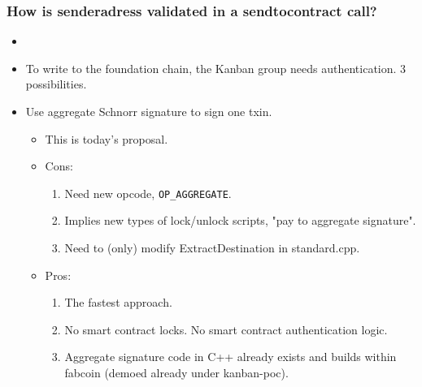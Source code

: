 \begin{frame}[fragile]
\frametitle{How is senderadress validated in a sendtocontract call?}
\begin{itemize}
\item 
\end{itemize}
\end{frame}

\begin{frame}[fragile]
\begin{itemize}
\item To write to the foundation chain, the Kanban group needs authentication. 3 possibilities.
\item Use aggregate Schnorr signature to sign one txin. 
\begin{itemize}
\item This is today's proposal.
\item Cons: 
\begin{enumerate}
\item Need new opcode, \verb|OP_AGGREGATE|. 
\item Implies new types of lock/unlock scripts, "pay to aggregate signature".
\item Need to (only) modify ExtractDestination in standard.cpp.
\end{enumerate}
\item Pros: 
\begin{enumerate}
\item The fastest approach.
\item No smart contract locks. No smart contract authentication logic.
\item Aggregate signature code in C++ already exists and builds within fabcoin (demoed already under kanban-poc).
\end{enumerate}
\end{itemize}
\end{itemize}
\end{frame}